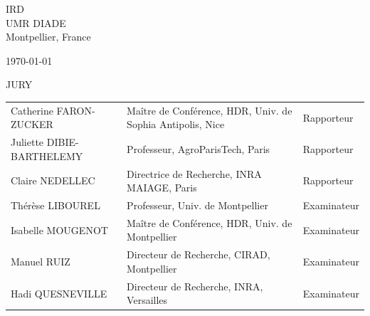 \documentclass[
11pt, %
french, %
singlespacing, %
headsepline, %
]{MastersDoctoralThesis} %
\begin{document}
\begin{titlepage}
\begin{center}
\begin{center}
\Large IRD\\
\Large UMR DIADE\\
\large Montpellier, France
\end{center}
\vspace{1cm}
{\today}
\vspace{1cm}
\\

\begin{center}
	JURY
\end{center}

\footnotesize
\begin{tabular}{ l l l}
Catherine FARON-ZUCKER  & Maître de Conférence, HDR, Univ. de Sophia Antipolis, Nice   & Rapporteur \\ 
Juliette DIBIE-BARTHELEMY & Professeur, AgroParisTech, Paris & Rapporteur \\ 
Claire NEDELLEC  & Directrice de Recherche, INRA MAIAGE, Paris & Rapporteur \\ 
Thérèse LIBOUREL & Professeur, Univ. de Montpellier  & Examinateur \\ 
Isabelle MOUGENOT & Maître de Conférence, HDR, Univ. de Montpellier  & Examinateur \\ 
Manuel RUIZ & Directeur de Recherche, CIRAD, Montpellier & Examinateur \\ 
Hadi QUESNEVILLE & Directeur de Recherche, INRA, Versailles & Examinateur \\ 
\end{tabular}
\normalsize

\vfill
\end{center}
\end{titlepage}





\end{document}
